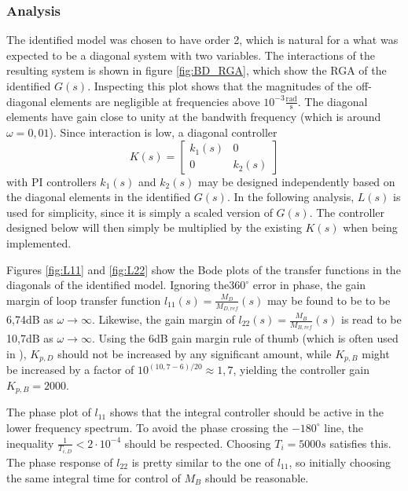 \documentclass[12pt]{article}
\begin{document}
\subsubsection{Analysis}
The identified model was chosen to have order 2, which is natural for a what was expected to be a diagonal system with two variables. The interactions of the resulting system is shown in figure \ref{fig:BD_RGA}, which show the RGA of the identified $G(s)$. Inspecting this plot shows that the magnitudes of the off-diagonal elements are negligible at frequencies above $10^{-3} \frac{\textrm{rad}}{\textrm{s}}$. The diagonal elements have gain close to unity at the bandwith frequency (which is around $\omega = 0,01$). Since interaction is low, a diagonal controller
\begin{equation}
K(s) =
\begin{bmatrix}
k_1(s) & 0\\
0 & k_2(s)
\end{bmatrix}
\end{equation}
with PI controllers $k_1(s)$ and $k_2(s)$ may be designed independently based on the diagonal elements in the identified $G(s)$. In the following analysis, $L(s)$ is used for simplicity, since it is simply a scaled version of $G(s)$. The controller designed below will then simply be multiplied by the existing $K(s)$ when being implemented.

Figures \ref{fig:L11} and \ref{fig:L22} show the Bode plots of the transfer functions in the diagonals of the identified model. Ignoring the$360^\circ$ error in phase, the gain margin of loop transfer function $l_{11}(s) = \frac{M_D}{M_{D, ref}}(s)$ may be found to be to be 6,74dB as $\omega \rightarrow \infty$. Likewise, the gain margin of $l_{22}(s) = \frac{M_B}{M_{B, ref}}(s)$ is read to be 10,7dB as $\omega \rightarrow \infty$. Using the 6dB gain margin rule of thumb (which is often used in \cite{regtek}), $K_{p, D}$ should not be increased by any significant amount, while $K_{p, B}$ might be increased by a factor of $10^{(10,7-6)/20} \approx 1,7$, yielding the controller gain $K_{p, B} = 2000$.

The phase plot of $l_{11}$ shows that the integral controller should be active in the lower frequency spectrum. To avoid the phase crossing the $-180^\circ$ line, the inequality $\frac{1}{T_{i, D}} < 2 \cdot 10^{-4}$ should be respected. Choosing $T_i = 5000s$ satisfies this. The phase response of $l_{22}$ is pretty similar to the one of $l_{11}$, so initially choosing the same integral time for control of $M_B$ should be reasonable.
\end{document}
